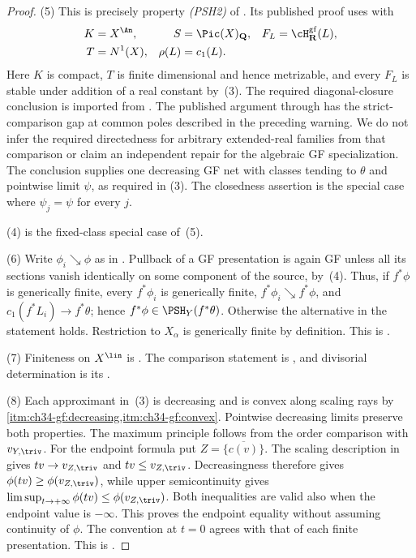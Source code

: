 \begin{proof}
(5) This is precisely property \emph{(PSH2)} of
\cite[Theorem~4.5]{BJ22}.  Its published proof uses
\cite[Lemma~4.6]{BJ22} with
\[
 \begin{aligned}
  K&=X^{\An},& S&=\Pic(X)_{\mathbf Q},
    &F_L&=\cH^{\mathrm{gf}}_{\mathbf R}(L),\\
  T&=N^1(X),& \rho(L)&=c_1(L).
 \end{aligned}
\]
Here $K$ is compact, $T$ is finite dimensional and hence metrizable,
and every $F_L$ is stable under addition of a real constant by
\,(3).
The required diagonal-closure conclusion is imported from
\cite[Theorem~4.5]{BJ22}.  The published argument through
\cite[Lemma~4.6]{BJ22} has the strict-comparison gap at common poles
described in the preceding warning.  We do not infer the required
directedness for arbitrary extended-real families from that comparison
or claim an independent repair for the algebraic GF specialization.
The conclusion supplies one decreasing GF net with classes tending to
$\theta$ and pointwise limit $\psi$, as required in
(3).  The closedness assertion is the special case
where $\psi_j=\psi$ for every $j$.

(4) is the fixed-class special case of~(5).

(6) Write $\phi_i\searrow\phi$ as in .  Pullback of a
GF presentation is again GF unless all its sections vanish identically on
some component of the source, by \,(4).  Thus,
if $f^*\phi$ is generically finite, every $f^*\phi_i$ is generically
finite, $f^*\phi_i\searrow f^*\phi$, and
$c_1(f^*L_i)\to f^*\theta$; hence
$f^*\phi\in\PSH_Y(f^*\theta)$.  Otherwise the alternative in the
statement holds.  Restriction to $X_\alpha$ is generically finite by
definition.  This is \cite[Theorem~4.7\,(iii)--(iv)]{BJ22}.

(7) Finiteness on $X^{\lin}$ is
\cite[Corollary~4.17]{BJ22}.  The comparison statement is
\cite[Theorem~4.22]{BJ22}, and divisorial determination is its
\cite[Corollary~4.23]{BJ22}.

(8) Each approximant in \,(3) is decreasing and is
convex along scaling rays by
\,\cref{itm:ch34-gf:decreasing,itm:ch34-gf:convex}.
Pointwise decreasing limits preserve both properties.  The maximum
principle follows from the order comparison with $v_{Y,\triv}$.
For the endpoint formula put $Z=\overline{\{c(v)\}}$.
The scaling description in  gives
$tv\to v_{Z,\triv}$ and $tv\leq v_{Z,\triv}$.
Decreasingness therefore gives
$\phi(tv)\geq\phi(v_{Z,\triv})$, while upper semicontinuity gives
$\limsup_{t\to+\infty}\phi(tv)\leq\phi(v_{Z,\triv})$.
Both inequalities are valid also when the endpoint value is $-\infty$.
This proves the endpoint equality without assuming continuity of $\phi$.
The convention at $t=0$ agrees with that of each finite presentation.
This is \cite[Proposition~4.12]{BJ22}.
\end{proof}

